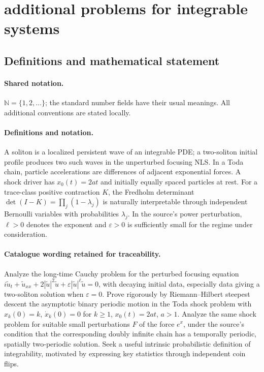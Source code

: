 \documentclass[11pt]{article}
\begin{document}
\section{additional problems for integrable systems}\label{statement}

\subsection{Definitions and mathematical statement}

\paragraph{Shared notation.}$\mathbb N=\{1,2,\ldots\}$; the standard number fields have their usual meanings. All additional conventions are stated locally.


\paragraph{Definitions and notation.}A soliton is a localized persistent wave of an integrable PDE; a two-soliton initial profile produces two such waves in the unperturbed focusing NLS. In a Toda chain, particle accelerations are differences of adjacent exponential forces. A shock driver has $x_0(t)=2at$ and initially equally spaced particles at rest. For a trace-class positive contraction $K$, the Fredholm determinant $\det(I-K)=\prod_j(1-\lambda_j)$ is naturally interpretable through independent Bernoulli variables with probabilities $\lambda_j$. In the source's power perturbation, $\ell>0$ denotes the exponent and $\varepsilon>0$ is sufficiently small for the regime under consideration.

\paragraph{Catalogue wording retained for traceability.}
Analyze the long-time Cauchy problem for the perturbed focusing equation $i\widetilde u_t+\widetilde u_{xx}+2|\widetilde u|^2\widetilde u+\varepsilon|\widetilde u|^\ell\widetilde u=0$, with decaying initial data, especially data giving a two-soliton solution when $\varepsilon=0$. Prove rigorously by Riemann--Hilbert steepest descent the asymptotic binary periodic motion in the Toda shock problem with $x_k(0)=k$, $\dot x_k(0)=0$ for $k\ge1$, $x_0(t)=2at$, $a>1$. Analyze the same shock problem for suitable small perturbations $F$ of the force $e^x$, under the source’s condition that the corresponding doubly infinite chain has a temporally periodic, spatially two-periodic solution. Seek a useful intrinsic probabilistic definition of integrability, motivated by expressing key statistics through independent coin flips.
\end{document}
